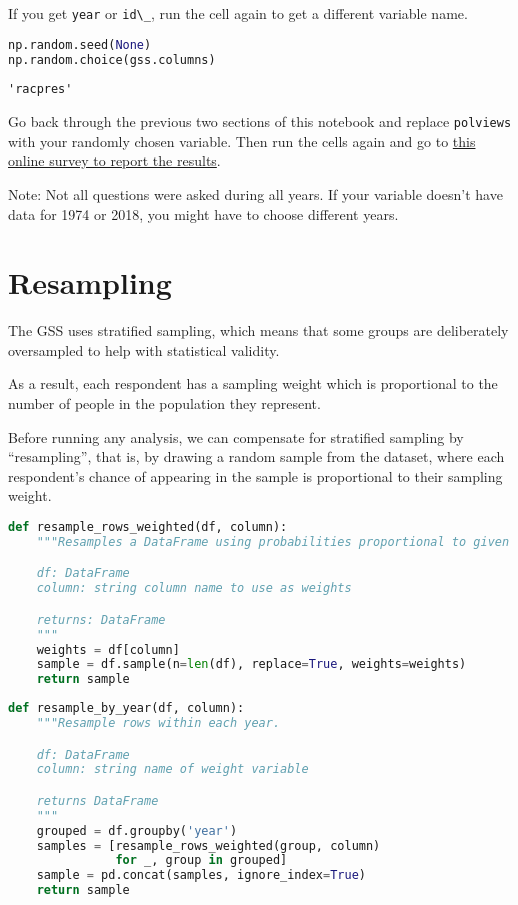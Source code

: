 If you get \passthrough{\lstinline!year!} or
\passthrough{\lstinline!id\_!}, run the cell again to get a different
variable name.

\begin{lstlisting}[language=Python,style=source]
np.random.seed(None)
np.random.choice(gss.columns)
\end{lstlisting}

\begin{lstlisting}[style=output]
'racpres'
\end{lstlisting}

Go back through the previous two sections of this notebook and replace
\passthrough{\lstinline!polviews!} with your randomly chosen variable.
Then run the cells again and go to
\href{https://forms.gle/tmST8YCu4qLc414F7}{this online survey to report
the results}.

Note: Not all questions were asked during all years. If your variable
doesn't have data for 1974 or 2018, you might have to choose different
years.

\hypertarget{resampling}{%
\section{Resampling}\label{resampling}}

The GSS uses stratified sampling, which means that some groups are
deliberately oversampled to help with statistical validity.

As a result, each respondent has a sampling weight which is proportional
to the number of people in the population they represent.

Before running any analysis, we can compensate for stratified sampling
by ``resampling'', that is, by drawing a random sample from the dataset,
where each respondent's chance of appearing in the sample is
proportional to their sampling weight.

\begin{lstlisting}[language=Python,style=source]
def resample_rows_weighted(df, column):
    """Resamples a DataFrame using probabilities proportional to given column.

    df: DataFrame
    column: string column name to use as weights

    returns: DataFrame
    """
    weights = df[column]
    sample = df.sample(n=len(df), replace=True, weights=weights)
    return sample
\end{lstlisting}

\begin{lstlisting}[language=Python,style=source]
def resample_by_year(df, column):
    """Resample rows within each year.

    df: DataFrame
    column: string name of weight variable

    returns DataFrame
    """
    grouped = df.groupby('year')
    samples = [resample_rows_weighted(group, column)
               for _, group in grouped]
    sample = pd.concat(samples, ignore_index=True)
    return sample
\end{lstlisting}


